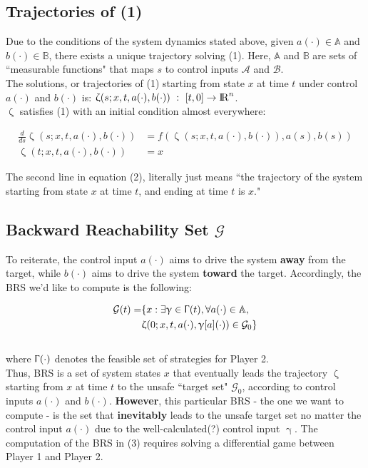 \documentclass{article}
\begin{document}
\newpage

\subsection{Trajectories of (1)}
\quad Due to the conditions of the system dynamics stated above, given $a(\cdot) \in \mathbb{A}$ and  $b(\cdot) \in \mathbb{B}$, there exists a unique trajectory solving (1). Here, $\mathbb{A}$ and $\mathbb{B}$ are sets of ``measurable functions" that maps $s$ to control inputs $\mathcal{A}$ and $\mathcal{B}$. \\
The solutions, or trajectories of (1) starting from state $x$ at time $t$ under control $a(\cdot)$ and $b(\cdot)$ is: $\upzeta(s;x,t,a(\cdot),b(\cdot)) \ : \ [t,0] \rightarrow {\rm I\!R}^n$. \\
$\upzeta$ satisfies (1) with an initial condition almost everywhere:

\begin{equation}
\begin{aligned}
\frac{d}{ds}\upzeta(s;x,t,a(\cdot),b(\cdot)) & = f(\upzeta(s;x,t,a(\cdot),b(\cdot)),a(s),b(s))\\
\upzeta(t;x,t,a(\cdot),b(\cdot)) & = x
\end{aligned}
\end{equation}

The second line in equation (2), literally just means ``the trajectory of the system starting from state $x$ at time $t$, and ending at time $t$ is $x$."

\subsection{Backward Reachability Set $\mathcal{G}$}
\quad To reiterate, the control input $a(\cdot)$ aims to drive the system \textbf{away} from the target, while $b(\cdot)$ aims to drive the system \textbf{toward} the target. Accordingly, the BRS we'd like to compute is the following:

\begin{equation}
\begin{aligned}
\mathcal{G}(t) = & \{x: \exists \upgamma \in \Upgamma(t), \forall a(\cdot) \in \mathbb{A},\\
& \upzeta(0;x,t,a(\cdot), \upgamma[a](\cdot)) \in \mathcal{G}_0\}
\end{aligned}
\end{equation}
\\
where $\Upgamma(\cdot)$ denotes the feasible set of strategies for Player 2.
\\
\quad Thus, BRS is a set of system states $x$ that eventually leads the trajectory $\upzeta$ starting from $x$ at time $t$ to the unsafe ``target set" $\mathcal{G}_0$, according to control inputs $a(\cdot)$ and $b(\cdot)$. \textbf{However}, this particular BRS - the one we want to compute - is the set that \textbf{inevitably} leads to the unsafe target set no matter the control input $a(\cdot)$ due to the well-calculated(?) control input $\upgamma$. The computation of the BRS in (3) requires solving a differential game between Player 1 and Player 2.
\end{document}
